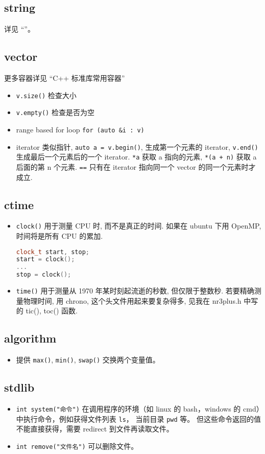 
\subsection{string}
详见 “”。

\subsection{vector}
更多容器详见 “C++ 标准库常用容器”
\begin{itemize}
\item \verb`v.size()` 检查大小
\item \verb`v.empty()` 检查是否为空
\item range based for loop \verb`for (auto &i : v)`
\item iterator 类似指针, \verb`auto a = v.begin()`, 生成第一个元素的 iterator, \verb`v.end()` 生成最后一个元素后的一个 iterator. \verb`*a` 获取 a 指向的元素, \verb`*(a + n)` 获取 a 后面的第 n 个元素. \verb`==` 只有在 iterator 指向同一个 vector 的同一个元素时才成立.
\end{itemize}

\subsection{ctime}
\begin{itemize}
\item \verb`clock()` 用于测量 CPU 时, 而不是真正的时间. 如果在 ubuntu 下用 OpenMP, 时间将是所有 CPU 的累加.
\begin{lstlisting}[language=cpp]
clock_t start, stop;
start = clock();
...
stop = clock();
\end{lstlisting}
\item \verb`time()` 用于测量从 1970 年某时刻起流逝的秒数, 但仅限于整数秒.
若要精确测量物理时间, 用 chrono, 这个头文件用起来要复杂得多, 见我在 nr3plus.h 中写的 tic(), toc() 函数.
\end{itemize}

\subsection{algorithm}
\begin{itemize}
\item 提供 \verb`max()`, \verb`min()`, \verb`swap()` 交换两个变量值。
\end{itemize}


\subsection{stdlib}
\begin{itemize}
\item \verb`int system("命令")` 在调用程序的环境（如 linux 的 bash，windows 的 cmd）中执行命令，例如获得文件列表 \verb`ls`， 当前目录 \verb`pwd` 等。 但这些命令返回的值不能直接获得，需要 redirect 到文件再读取文件。
\item \verb`int remove("文件名")` 可以删除文件。
\end{itemize}

